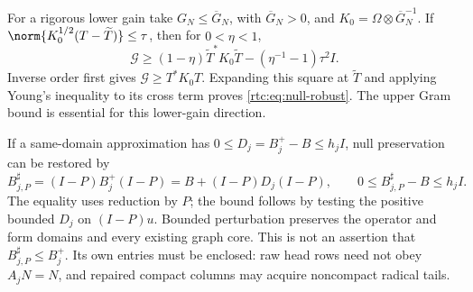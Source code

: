 \documentclass[11pt,a4paper]{article}
\numberwithin{equation}{section}
\theoremstyle{definition}\newtheorem{definition}[theorem]{Definition}
\theoremstyle{remark}\newtheorem{remark}[theorem]{Remark}
\begin{document}
For a rigorous lower gain take $G_N\le\overline G_N$, with
$\overline G_N>0$, and $K_0=\Omega\otimes\overline G_N^{-1}$.
If $\norm{K_0^{1/2}(T-\widetilde T)}\le\tau$, then for $0<\eta<1$,
\begin{equation}\label{rtc:eq:null-robust}
 \mathcal G\ge(1-\eta)\widetilde T^*K_0\widetilde T
                  -(\eta^{-1}-1)\tau^2I.
\end{equation}
Inverse order first gives $\mathcal G\ge T^*K_0T$.
Expanding this square at $\widetilde T$ and applying Young's inequality
to its cross term proves \eqref{rtc:eq:null-robust}.
The upper Gram bound is essential for this lower-gain direction.

If a same-domain approximation has
$0\le D_j=B_j^+-B\le h_jI$, null preservation can be restored by
\begin{equation}\label{rtc:eq:null-head}
 B_{j,P}^{\sharp}=(I-P)B_j^+(I-P)
                  =B+(I-P)D_j(I-P),\qquad
 0\le B_{j,P}^{\sharp}-B\le h_jI.
\end{equation}
The equality uses reduction by $P$; the bound follows by testing the
positive bounded $D_j$ on $(I-P)u$. Bounded perturbation preserves the
operator and form domains and every existing graph core.
This is not an assertion that $B_{j,P}^{\sharp}\le B_j^+$.
Its own entries must be enclosed: raw head rows need not obey $A_jN=N$,
and repaired compact columns may acquire noncompact radical tails.
\end{document}
